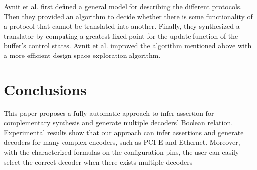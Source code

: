 \documentclass[journal]{IEEEtran}
\begin{document}
Avnit et al. \cite{converter_date08} first defined a general model for describing the different protocols.
Then they provided an algorithm to decide
whether there is  some functionality of a protocol that cannot be translated into another.
Finally,
they synthesized a translator by computing a greatest fixed point for the update function of the buffer's control states.
Avnit et al.\cite{converter_date09} improved the algorithm mentioned above with a more efficient design space exploration algorithm.



\section{Conclusions}\label{sec_conclude}

This paper proposes a fully automatic approach to infer assertion for complementary synthesis and generate multiple decoders' Boolean relation.
Experimental results show that our approach can infer assertions and generate decoders for many complex encoders,
such as PCI-E\cite{PCIESPEC} and Ethernet\cite{IEEE80232002}.
Moreover,
with the characterized formulas on the configuration pins,
the user can easily select the correct decoder when there exists multiple decoders.


%
%

\end{document}
